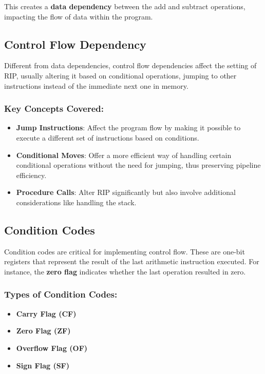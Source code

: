 \documentclass{article}
\begin{document}
This creates a \textbf{data dependency} between the add and subtract operations, impacting the flow of data within the program.

\subsection{Control Flow Dependency}

Different from data dependencies, control flow dependencies affect the setting of RIP, usually altering it based on conditional operations, jumping to other instructions instead of the immediate next one in memory.

\subsubsection{Key Concepts Covered:}

\begin{itemize}
    \item \textbf{Jump Instructions}: Affect the program flow by making it possible to execute a different set of instructions based on conditions.
    \item \textbf{Conditional Moves}: Offer a more efficient way of handling certain conditional operations without the need for jumping, thus preserving pipeline efficiency.
    \item \textbf{Procedure Calls}: Alter RIP significantly but also involve additional considerations like handling the stack.
\end{itemize}

\subsection{Condition Codes}

Condition codes are critical for implementing control flow. These are one-bit registers that represent the result of the last arithmetic instruction executed. For instance, the \textbf{zero flag} indicates whether the last operation resulted in zero.

\subsubsection{Types of Condition Codes:}

\begin{itemize}
    \item \textbf{Carry Flag (CF)}
    \item \textbf{Zero Flag (ZF)}
    \item \textbf{Overflow Flag (OF)}
    \item \textbf{Sign Flag (SF)}
\end{itemize}
\end{document}
